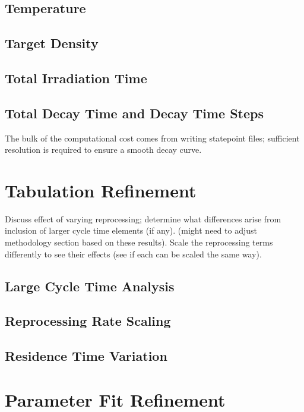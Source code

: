 \documentclass[edeposit,fullpage,hidelinks]{uiucthesis2018}
\begin{document}
\subsection{Temperature}

\subsection{Target Density}

\subsection{Total Irradiation Time}

\subsection{Total Decay Time and Decay Time Steps}
The bulk of the computational cost comes from writing statepoint files; sufficient resolution is required to ensure a smooth decay curve.

\section{Tabulation Refinement}

Discuss effect of varying reprocessing; determine what differences arise from inclusion of larger cycle time elements (if any). (might need to adjust methodology section based on these results).
Scale the reprocessing terms differently to see their effects (see if each can be scaled the same way).

\subsection{Large Cycle Time Analysis}
\label{sec:large-tcyc}

\subsection{Reprocessing Rate Scaling}
\label{sec:repr-scale}

\subsection{Residence Time Variation}
\label{sec:res-time-var}

\section{Parameter Fit Refinement}
\end{document}
